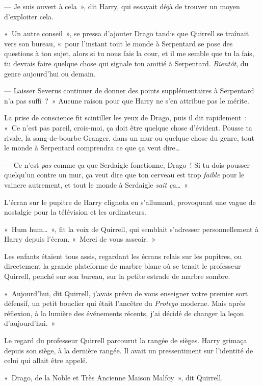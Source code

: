 --- Je suis ouvert à cela~», dit Harry, qui essayait déjà de trouver un moyen d'exploiter cela.

«~Un autre conseil~», se pressa d'ajouter Drago tandis que Quirrell se traînait vers son bureau, «~pour l'instant tout le monde à Serpentard se pose des questions à ton sujet, alors si tu nous fais la cour, et il me semble que tu la fais, tu devrais faire quelque chose qui signale ton amitié à Serpentard.
\emph{Bientôt}, du genre aujourd'hui ou demain.

--- Laisser Severus continuer de donner des points supplémentaires à Serpentard n'a pas suffi~?~»
Aucune raison pour que Harry ne s'en attribue pas le mérite.

La prise de conscience fit scintiller les yeux de Drago, puis il dit rapidement~:
«~Ce n'est pas pareil, crois-moi, ça doit être quelque chose d'évident.
Pousse ta rivale, la sang-de-bourbe Granger, dans un mur ou quelque chose du genre, tout le monde à Serpentard comprendra ce que ça veut dire…

--- Ce n'est \emph{pas} comme ça que Serdaigle fonctionne, Drago~!
Si tu dois pousser quelqu'un contre un mur, ça veut dire que ton cerveau est trop \emph{faible} pour le vaincre autrement, et tout le monde à Serdaigle \emph{sait ça}…~»

L'écran sur le pupitre de Harry clignota en s'allumant, provoquant une vague de nostalgie pour la télévision et les ordinateurs.

«~Hum hum…~», fit la voix de Quirrell, qui semblait s'adresser personnellement à Harry depuis l'écran.
«~Merci de vous asseoir.~»

\later

Les enfants étaient tous assis, regardant les écrans relais sur les pupitres, ou directement la grande plateforme de marbre blanc où se tenait le professeur Quirrell, penché sur son bureau, sur la petite estrade de marbre sombre.

«~Aujourd'hui, dit Quirrell, j'avais prévu de vous enseigner votre premier sort défensif, un petit bouclier qui était l'ancêtre du \emph{Protego} moderne.
Mais après réflexion, à la lumière des événements récents, j'ai décidé de changer la leçon d'aujourd'hui.~»

Le regard du professeur Quirrell parcourut la rangée de sièges.
Harry grimaça depuis son siège, à la dernière rangée.
Il avait un pressentiment sur l'identité de celui qui allait être appelé.

«~Drago, de la Noble et Très Ancienne Maison Malfoy~», dit Quirrell.


